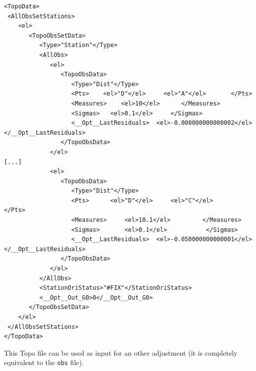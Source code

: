 \begin{lstlisting}
<TopoData>
 <AllObsSetStations>
    <el>
       <TopoObsSetData>
          <Type>"Station"</Type>
          <AllObs>
             <el>
                <TopoObsData>
                   <Type>"Dist"</Type>
                   <Pts>    <el>"D"</el>     <el>"A"</el>       </Pts>
                   <Measures>    <el>10</el>      </Measures>
                   <Sigmas>   <el>0.1</el>     </Sigmas>
                   <__Opt__LastResiduals>  <el>-0.000000000000002</el>  </__Opt__LastResiduals>
                </TopoObsData>
             </el>
[...]
             <el>
                <TopoObsData>
                   <Type>"Dist"</Type>
                   <Pts>      <el>"D"</el>     <el>"C"</el>          </Pts>
                   <Measures>     <el>10.1</el>         </Measures>
                   <Sigmas>       <el>0.1</el>           </Sigmas>
                   <__Opt__LastResiduals>  <el>-0.050000000000001</el>  </__Opt__LastResiduals>
                </TopoObsData>
             </el>
          </AllObs>
          <StationOriStatus>"#FIX"</StationOriStatus>
          <__Opt__Out_G0>0</__Opt__Out_G0>
       </TopoObsSetData>
    </el>
 </AllObsSetStations>
</TopoData>
\end{lstlisting}

This Topo file can be used as input for an other adjustment (it is completely equivalent to the {\tt obs} file).
